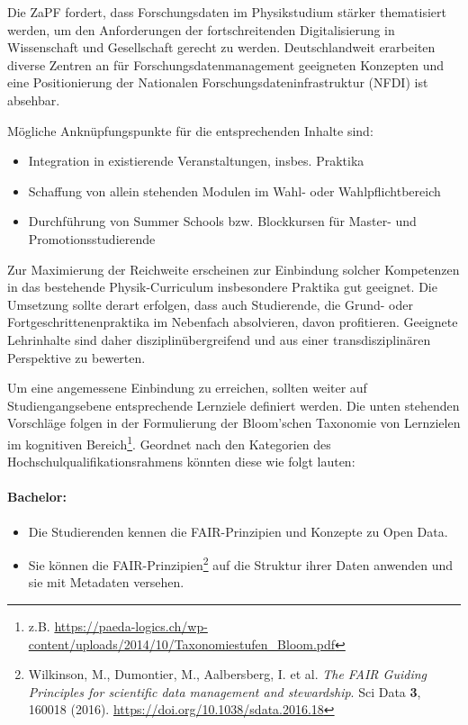\documentclass[DIV=calc]{scrartcl}
\begin{document}
Die ZaPF fordert, dass Forschungsdaten im Physikstudium stärker thematisiert werden, um den Anforderungen der fortschreitenden Digitalisierung in Wissenschaft und Gesellschaft gerecht zu werden. Deutschlandweit erarbeiten diverse Zentren an für Forschungsdatenmanagement geeigneten Konzepten und eine Positionierung der Nationalen Forschungsdateninfrastruktur (NFDI) ist absehbar.

Mögliche Anknüpfungspunkte für die entsprechenden Inhalte sind:
\begin{itemize}
	\item Integration in existierende Veranstaltungen, insbes. Praktika
	\item Schaffung von allein stehenden Modulen im Wahl- oder Wahlpflichtbereich
	\item Durchführung von Summer Schools bzw. Blockkursen für Master- und Promotionsstudierende
\end{itemize}

Zur Maximierung der Reichweite erscheinen zur Einbindung solcher Kompetenzen in das bestehende Physik-Curriculum insbesondere Praktika gut geeignet. Die Umsetzung sollte derart erfolgen, dass auch Studierende, die Grund- oder Fortgeschrittenenpraktika im Nebenfach absolvieren, davon profitieren. Geeignete Lehrinhalte sind daher disziplinübergreifend und aus einer transdisziplinären Perspektive zu bewerten.

Um eine angemessene Einbindung zu erreichen, sollten weiter auf Studiengangsebene entsprechende Lernziele definiert werden. Die unten stehenden Vorschläge folgen in der Formulierung der Bloom'schen Taxonomie von Lernzielen im kognitiven Bereich\footnote{z.B. \url{https://paeda-logics.ch/wp-content/uploads/2014/10/Taxonomiestufen_Bloom.pdf}}. Geordnet nach den Kategorien des Hochschulqualifikationsrahmens könnten diese wie folgt lauten:

\paragraph{Bachelor:}
\begin{itemize}
	\item Die Studierenden kennen die FAIR-Prinzipien und Konzepte zu Open Data.
	\item Sie können die FAIR-Prinzipien\footnote{Wilkinson, M., Dumontier, M., Aalbersberg, I. et al. \textit{The FAIR Guiding Principles for scientific data management and stewardship}. Sci Data \textbf{3}, 160018 (2016). \url{https://doi.org/10.1038/sdata.2016.18}}\xspace auf die Struktur ihrer Daten anwenden und sie mit Metadaten versehen.
\end{itemize}
\clearpage
\end{document}
